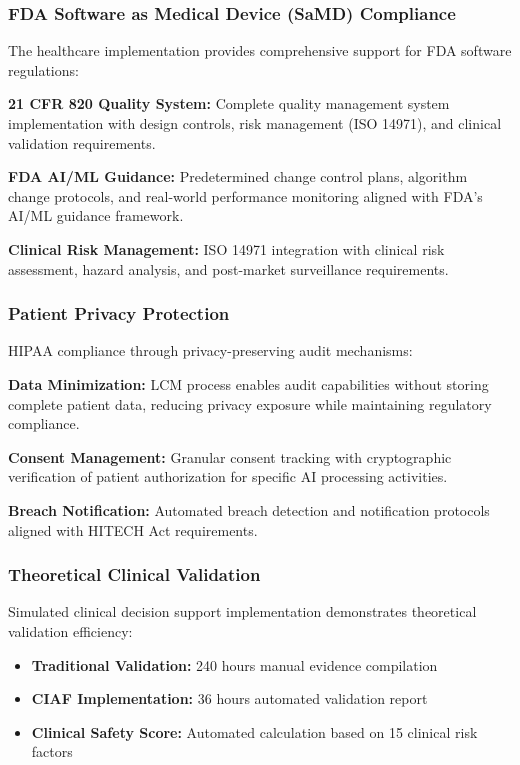 \documentclass[12pt,a4paper]{article}
\begin{document}
\subsubsection{FDA Software as Medical Device (SaMD) Compliance}

The healthcare implementation provides comprehensive support for FDA software regulations:

\textbf{21 CFR 820 Quality System:} Complete quality management system implementation with design controls, risk management (ISO 14971), and clinical validation requirements.

\textbf{FDA AI/ML Guidance:} Predetermined change control plans, algorithm change protocols, and real-world performance monitoring aligned with FDA's AI/ML guidance framework.

\textbf{Clinical Risk Management:} ISO 14971 integration with clinical risk assessment, hazard analysis, and post-market surveillance requirements.

\subsubsection{Patient Privacy Protection}

HIPAA compliance through privacy-preserving audit mechanisms:

\textbf{Data Minimization:} LCM process enables audit capabilities without storing complete patient data, reducing privacy exposure while maintaining regulatory compliance.

\textbf{Consent Management:} Granular consent tracking with cryptographic verification of patient authorization for specific AI processing activities.

\textbf{Breach Notification:} Automated breach detection and notification protocols aligned with HITECH Act requirements.

\subsubsection{Theoretical Clinical Validation}

Simulated clinical decision support implementation demonstrates theoretical validation efficiency:

\begin{itemize}
\item \textbf{Traditional Validation:} 240 hours manual evidence compilation
\item \textbf{CIAF Implementation:} 36 hours automated validation report
\item \textbf{Clinical Safety Score:} Automated calculation based on 15 clinical risk factors
\end{itemize}
\end{document}
